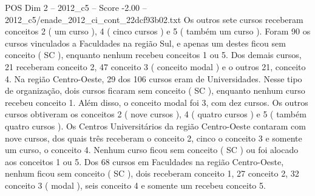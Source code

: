 \begin{textsample}{POS Dim 2 – 2012\_c5 – Score -2.00 – 2012\_c5/enade\_2012\_ci\_cont\_22dcf93b02.txt}
Os outros sete cursos receberam conceitos 2 ( um curso ), 4 ( cinco cursos ) e 5 ( também um curso ).
Foram 90 os cursos vinculados a Faculdades na região Sul, e apenas um destes ficou sem conceito ( SC ), enquanto nenhum recebeu conceitos 1 ou 5.
Dos demais cursos, 21 receberam conceito 2, 47 conceito 3 ( conceito modal ) e o outros 21, conceito 4.
Na região Centro-Oeste, 29 dos 106 cursos eram de Universidades.
Nesse tipo de organização, dois cursos ficaram sem conceito ( SC ), enquanto nenhum curso recebeu conceito 1.
Além disso, o conceito modal foi 3, com dez cursos.
Os outros cursos obtiveram os conceitos 2 ( nove cursos ), 4 ( quatro cursos ) e 5 ( também quatro cursos ).
Os Centros Universitários da região Centro-Oeste contaram com nove cursos, dos quais três receberam o conceito 2, cinco o conceito 3 e somente um curso, o conceito 4.
Nenhum curso ficou sem conceito ( SC ) ou foi alocado aos conceitos 1 ou 5.
Dos 68 cursos em Faculdades na região Centro-Oeste, nenhum ficou sem conceito ( SC ), dois receberam conceito 1, 27 conceito 2, 32 conceito 3 ( modal ), seis conceito 4 e somente um recebeu conceito 5.

\end{textsample}
